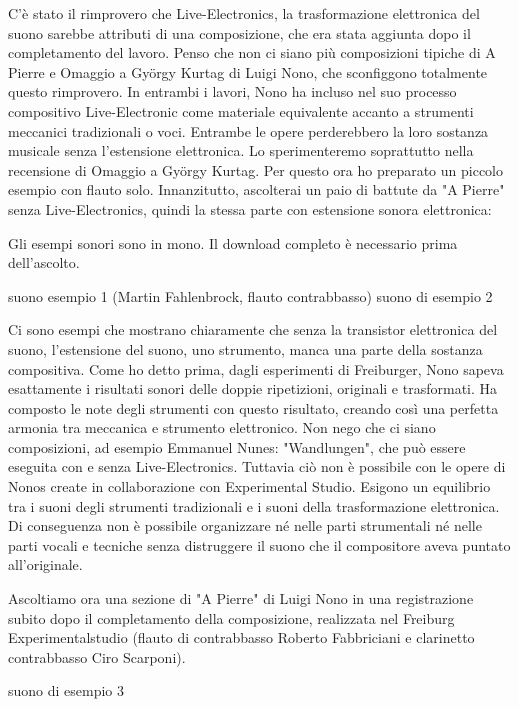 C'è stato il rimprovero che Live-Electronics, la trasformazione elettronica del suono sarebbe attributi di una composizione, che era stata aggiunta dopo il completamento del lavoro. Penso che non ci siano più composizioni tipiche di A Pierre e Omaggio a György Kurtag di Luigi Nono, che sconfiggono totalmente questo rimprovero. In entrambi i lavori, Nono ha incluso nel suo processo compositivo Live-Electronic come materiale equivalente accanto a strumenti meccanici tradizionali o voci. Entrambe le opere perderebbero la loro sostanza musicale senza l'estensione elettronica.
Lo sperimenteremo soprattutto nella recensione di Omaggio a György Kurtag. Per questo ora ho preparato un piccolo esempio con flauto solo. Innanzitutto, ascolterai un paio di battute da "A Pierre" senza Live-Electronics, quindi la stessa parte con estensione sonora elettronica:

Gli esempi sonori sono in mono. Il download completo è necessario prima dell'ascolto.

suono esempio 1 (Martin Fahlenbrock, flauto contrabbasso)
suono di esempio 2

Ci sono esempi che mostrano chiaramente che senza la transistor elettronica del suono, l'estensione del suono, uno strumento, manca una parte della sostanza compositiva. Come ho detto prima, dagli esperimenti di Freiburger, Nono sapeva esattamente i risultati sonori delle doppie ripetizioni, originali e trasformati. Ha composto le note degli strumenti con questo risultato, creando così una perfetta armonia tra meccanica e strumento elettronico. Non nego che ci siano composizioni, ad esempio Emmanuel Nunes: "Wandlungen", che può essere eseguita con e senza Live-Electronics. Tuttavia ciò non è possibile con le opere di Nonos create in collaborazione con Experimental Studio. Esigono un equilibrio tra i suoni degli strumenti tradizionali e i suoni della trasformazione elettronica. Di conseguenza non è possibile organizzare né nelle parti strumentali né nelle parti vocali e tecniche senza distruggere il suono che il compositore aveva puntato all'originale.

Ascoltiamo ora una sezione di "A Pierre" di Luigi Nono in una registrazione subito dopo il completamento della composizione, realizzata nel Freiburg Experimentalstudio (flauto di contrabbasso Roberto Fabbriciani e clarinetto contrabbasso Ciro Scarponi).

suono di esempio 3


